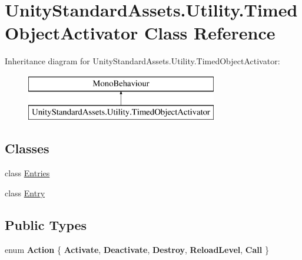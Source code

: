 \hypertarget{class_unity_standard_assets_1_1_utility_1_1_timed_object_activator}{}\section{Unity\+Standard\+Assets.\+Utility.\+Timed\+Object\+Activator Class Reference}
\label{class_unity_standard_assets_1_1_utility_1_1_timed_object_activator}
Inheritance diagram for Unity\+Standard\+Assets.\+Utility.\+Timed\+Object\+Activator\+:\begin{figure}[H]
\begin{center}
\leavevmode
\includegraphics[height=2.000000cm]{class_unity_standard_assets_1_1_utility_1_1_timed_object_activator}
\end{center}
\end{figure}
\subsection*{Classes}
\begin{DoxyCompactItemize}
\item 
class \hyperlink{class_unity_standard_assets_1_1_utility_1_1_timed_object_activator_1_1_entries}{Entries}
\item 
class \hyperlink{class_unity_standard_assets_1_1_utility_1_1_timed_object_activator_1_1_entry}{Entry}
\end{DoxyCompactItemize}
\subsection*{Public Types}
\begin{DoxyCompactItemize}
\item 
\mbox{\label{class_unity_standard_assets_1_1_utility_1_1_timed_object_activator_a4fd60b3607bc774ff633811e0b2b2090}} 
enum {\bfseries Action} \{ \newline
{\bfseries Activate}, 
{\bfseries Deactivate}, 
{\bfseries Destroy}, 
{\bfseries Reload\+Level}, 
\newline
{\bfseries Call}
 \}
\end{DoxyCompactItemize}
